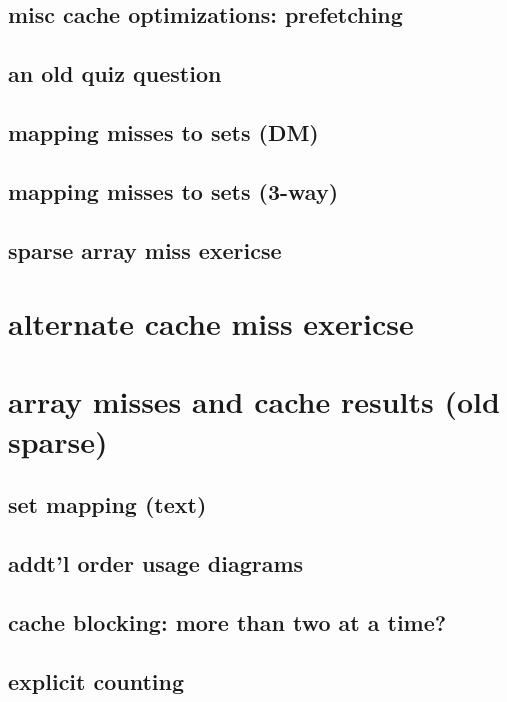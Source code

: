 \subsection{misc cache optimizations: prefetching}


\subsection{an old quiz question}


\subsection{mapping misses to sets (DM)}

\subsection{mapping misses to sets (3-way)}


\subsection{sparse array miss exericse}


\section{alternate cache miss exericse}


\section{array misses and cache results (old sparse)}


\subsection{set mapping (text)}




\subsection{addt'l order usage diagrams}

\subsection{cache blocking: more than two at a time?}

%


\subsection{explicit counting}



